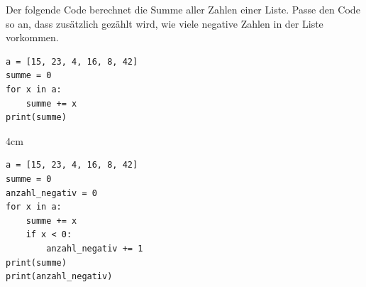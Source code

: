 \question[4]
Der folgende Code berechnet die Summe aller Zahlen einer Liste. Passe den Code so an, 
dass zusätzlich gezählt wird, wie viele negative Zahlen in der Liste vorkommen.
\begin{lstlisting}
a = [15, 23, 4, 16, 8, 42]
summe = 0
for x in a:
    summe += x
print(summe)
\end{lstlisting}

\begin{solutionbox}{4cm}
\begin{lstlisting}
a = [15, 23, 4, 16, 8, 42]
summe = 0
anzahl_negativ = 0
for x in a:
    summe += x
    if x < 0:
        anzahl_negativ += 1
print(summe)
print(anzahl_negativ)
\end{lstlisting}
\end{solutionbox}